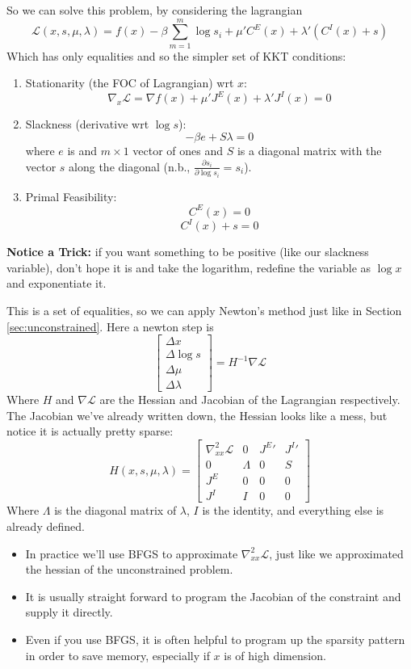 \documentclass[twoside]{article}
\begin{document}
 So we can solve this problem, by considering the lagrangian
 $$ \mathcal{L}(x, s, \mu, \lambda) = f(x) - \beta \sum_{m=1}^m \log s_i + \mu' C^E(x) + \lambda' (C^I(x) + s) $$
 Which has only equalities and so the simpler set of KKT conditions: 
 \begin{enumerate}
\item Stationarity (the FOC of Lagrangian) wrt $x$: 
$$ \nabla_x \mathcal{L} = \nabla f(x) + \mu' J^E(x) + \lambda' J^I(x) = 0 $$
\item Slackness (derivative wrt $\log s$): 
$$ -\beta e + S \lambda = 0 $$
where $e$ is and $m \times 1$ vector of ones and $S$ is a diagonal matrix with the vector $s$ along the diagonal (n.b.,  $\frac{\partial s_i}{\partial \log s_i} = s_i$). 
\item Primal Feasibility:
$$C^E(x) = 0$$
$$C^I(x) + s =  0 $$
\end{enumerate}

{\bf Notice a Trick:} if you want something to be positive (like our slackness variable), don't hope it is and take the logarithm, redefine the variable as $\log x$ and exponentiate it. 

This is a set of equalities, so we can apply Newton's method just like in Section \ref{sec:unconstrained}.  Here a newton step is
\begin{equation*}
\begin{bmatrix} \Delta x \\ \Delta \log s \\ \Delta \mu \\ \Delta \lambda \end{bmatrix} = H^{-1} \nabla \mathcal{L} 
\end{equation*}
Where  $H$ and $\nabla \mathcal{L}$ are the Hessian and Jacobian of the Lagrangian respectively. The Jacobian we've already written down, the Hessian looks like a mess, but notice it is actually pretty sparse: 
$$
H(x, s, \mu, \lambda) = \begin{bmatrix} \nabla_{xx}^2 \mathcal{L} &  0 & {J^E}' & {J^I}' \\
     0 & \Lambda & 0 & S \\
     J^E & 0 & 0 & 0 \\
     J^I & I & 0 & 0 \end{bmatrix}
$$
Where $\Lambda$ is the diagonal matrix of $\lambda$, $I$ is the identity, and everything else is already defined.  

\begin{itemize}
\item In practice we'll use BFGS to approximate $\nabla_{xx}^2 \mathcal{L}$, just like we approximated the hessian of the unconstrained problem. 
\item It is usually straight forward to program the Jacobian of the constraint and supply it directly. 
\item Even if you use BFGS, it is often helpful to program up the sparsity pattern in order to save memory, especially if $x$ is of high dimension. 
\end{itemize}
\end{document}
